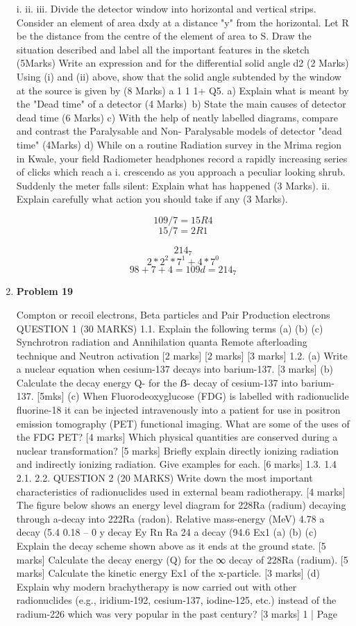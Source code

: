 \documentclass[12pt]{article}  %
\begin{document}
\begin{enumerate}
i.
ii.
iii.
Divide the detector window into horizontal and vertical strips. Consider an element of area dxdy at a distance "y" from the horizontal. Let R be the distance from the centre
of the element of area to S. Draw the situation described and label all the important features in the sketch (5Marks)
Write an expression and for the differential solid angle d2 (2 Marks)
Using (i) and (ii) above, show that the solid angle subtended by the window at the
source is given by
(8 Marks)
a
1
1
1+
Q5.
a) Explain what is meant by the "Dead time" of a detector (4 Marks)\
b) State the main causes of detector dead time (6 Marks)
c) With the help of neatly labelled diagrams, compare and contrast the Paralysable and Non- Paralysable models of detector "dead time" (4Marks)
d) While on a routine Radiation survey in the Mrima region in Kwale, your field Radiometer headphones record a rapidly increasing series of clicks which reach a
i.
crescendo as you approach a peculiar looking shrub. Suddenly the meter falls silent:
Explain what has happened (3 Marks).
ii. Explain carefully what action you should take if any (3 Marks).


\[109 / 7 = 15 R4\]
\[15 / 7 = 2 R1\]

\[214_{7}\]
\[2*2^{2}*7^{1}+4*7^{0}\]
\[98+7+4 =109d=214_{7}\]



\item \textbf{Problem 19} ﻿

Compton or recoil electrons, Beta particles and Pair Production electrons
QUESTION 1 (30 MARKS)
1.1.
Explain the following terms
(a)
(b)
(c)
Synchrotron radiation and Annihilation quanta
Remote afterloading technique and Neutron activation
[2 marks]
[2 marks]
[3 marks]
1.2. (a) Write a nuclear equation when cesium-137 decays into barium-137. [3 marks] (b) Calculate the decay energy Q- for the ẞ- decay of cesium-137 into barium-137. [5mks] (c) When Fluorodeoxyglucose (FDG) is labelled with radionuclide fluorine-18 it can be injected intravenously into a patient for use in positron emission tomography (PET) functional imaging. What are some of the uses of the FDG PET? [4 marks] Which physical quantities are conserved during a nuclear transformation? [5 marks] Briefly explain directly ionizing radiation and indirectly ionizing radiation. Give examples for each. [6 marks]
1.3.
1.4
2.1.
2.2.
QUESTION 2 (20 MARKS)
Write down the most important characteristics of radionuclides used in external beam radiotherapy.
[4 marks]
The figure below shows an energy level diagram for 228Ra (radium) decaying through a-decay into 222Ra (radon).
Relative mass-energy (MeV)
4.78
a decay (5.4%
0.18 --
0
y decay Ey
Rn
Ra
24
a decay (94.6%
Ex1
(a)
(b)
(c)
Explain the decay scheme shown above as it ends at the ground state. [5 marks] Calculate the decay energy (Q) for the ∞ decay of 228Ra (radium). [5 marks] Calculate the kinetic energy Ex1 of the x-particle.
[3 marks]
(d)
Explain why modern brachytherapy is now carried out with other radionuclides (e.g., iridium-192, cesium-137, iodine-125, etc.) instead of the radium-226 which was very popular in the past century?
[3 marks]
1 | Page


\end{enumerate}
\end{document}
